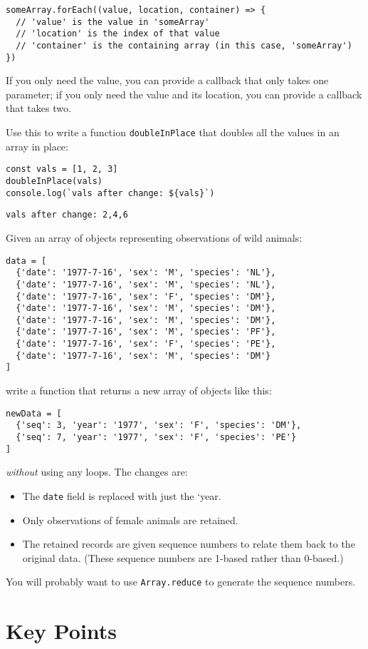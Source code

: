 \begin{verbatim}
someArray.forEach((value, location, container) => {
  // 'value' is the value in 'someArray'
  // 'location' is the index of that value
  // 'container' is the containing array (in this case, 'someArray')
})
\end{verbatim}

If you only need the value,
you can provide a callback that only takes one parameter;
if you only need the value and its location,
you can provide a callback that takes two.

Use this to write a function \texttt{doubleInPlace}
that doubles all the values in an array in place:

\begin{verbatim}
const vals = [1, 2, 3]
doubleInPlace(vals)
console.log(`vals after change: ${vals}`)
\end{verbatim}

\begin{verbatim}
vals after change: 2,4,6
\end{verbatim}


Given an array of objects representing observations of wild animals:

\begin{verbatim}
data = [
  {'date': '1977-7-16', 'sex': 'M', 'species': 'NL'},
  {'date': '1977-7-16', 'sex': 'M', 'species': 'NL'},
  {'date': '1977-7-16', 'sex': 'F', 'species': 'DM'},
  {'date': '1977-7-16', 'sex': 'M', 'species': 'DM'},
  {'date': '1977-7-16', 'sex': 'M', 'species': 'DM'},
  {'date': '1977-7-16', 'sex': 'M', 'species': 'PF'},
  {'date': '1977-7-16', 'sex': 'F', 'species': 'PE'},
  {'date': '1977-7-16', 'sex': 'M', 'species': 'DM'}
]
\end{verbatim}

\noindent
write a function that returns a new array of objects like this:

\begin{verbatim}
newData = [
  {'seq': 3, 'year': '1977', 'sex': 'F', 'species': 'DM'},
  {'seq': 7, 'year': '1977', 'sex': 'F', 'species': 'PE'}
]
\end{verbatim}

\emph{without} using any loops.
The changes are:

\begin{itemize}
\item
  The \texttt{date} field is replaced with just the `year.
\item
  Only observations of female animals are retained.
\item
  The retained records are given sequence numbers to relate them back to the original data.
  (These sequence numbers are 1-based rather than 0-based.)
\end{itemize}

You will probably want to use \texttt{Array.reduce} to generate the sequence numbers.

\section*{Key Points}


